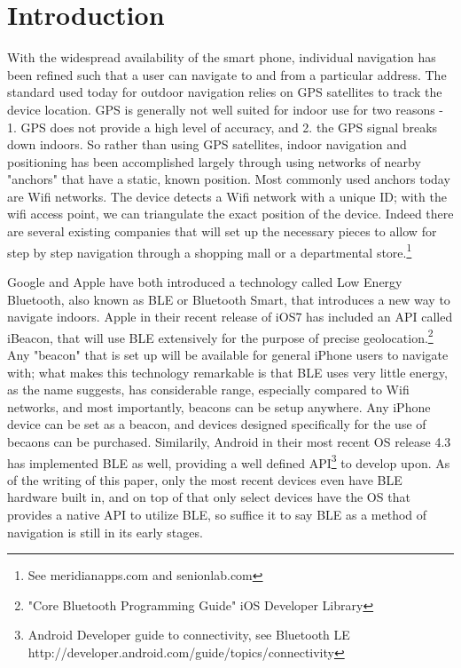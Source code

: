 \documentclass{sig-alternate}
\begin{document}
\section{Introduction}
\label{sec:intro}
 With the widespread availability of the smart phone, individual 
navigation has been refined such that a user can navigate to and 
from a particular address. The standard used today for outdoor 
navigation relies on GPS satellites to track the device location. GPS 
is generally not well suited for indoor use for two reasons - 1. GPS 
does not provide a high level of accuracy, and 2. the GPS signal 
breaks down indoors. So rather than using GPS satellites, indoor 
navigation and positioning has been accomplished largely through 
using networks of nearby "anchors" that have a static, known position. 
Most commonly used anchors today are Wifi networks. The device 
detects a Wifi network with a unique ID; with the wifi access point, 
we can triangulate the exact position of the device. Indeed there are 
several existing companies that will set up the necessary pieces to 
allow for step by step navigation through a shopping mall or a 
departmental store.\footnote{ See meridianapps.com and senionlab.com}

Google and Apple have both introduced a technology called Low 
Energy Bluetooth, also known as BLE or Bluetooth Smart, that 
introduces a new way to navigate indoors. Apple in their recent 
release of iOS7 has included an API called iBeacon, that will use BLE
extensively for the purpose of precise geolocation.\footnote{"Core 
Bluetooth Programming Guide" iOS Developer Library} Any "beacon" 
that is set up will be available for general iPhone users to navigate
with; what makes this technology remarkable is that BLE uses very
little energy, as the name suggests, has considerable range, especially
compared to Wifi networks, and most importantly, beacons can be
setup anywhere. Any iPhone device can be set as a beacon, and 
devices designed specifically for the use of becaons can be purchased.
Similarily, Android in their most recent OS release 4.3 has implemented
BLE as well, providing a well defined 
API\footnote{Android Developer guide to connectivity, see Bluetooth LE
http://developer.android.com/guide/topics/connectivity} 
to develop upon. As of the 
writing of this paper, only the most recent devices even have BLE 
hardware built in, and on top of that only select devices have the OS 
that provides a native API to utilize BLE, so suffice it to say BLE as 
a method of navigation is still in its early stages.
\end{document}
